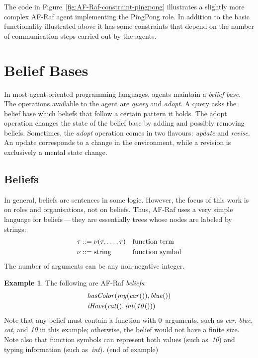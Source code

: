 \documentclass[a4paper,12pt,oneside,fleqn]{book} %
\theoremstyle{plain}
\theoremstyle{definition}
\newtheorem{example}{Example}
\theoremstyle{remark}
\newcommand{\eox}[1]{\hskip5mm\null\nobreak\hfill#1}
\newcommand{\eoe}{\eox{(end of example)}}
\newcommand{\rg}[1]{\marginpar{\tiny\raggedright\textcolor{blue}{\bf rg:} #1}}
\begin{document}
\rg{It's ${\it value}:{\it type}$, not ${\it type}:{\it value}$.}

The code in Figure~\ref{fig:AF-Raf-constraint-pingpong} illustrates a
slightly more complex AF-Raf agent implementing the PingPong role. In
addition to the basic functionality illustrated above it has some
constraints that depend on the number of communication steps carried out by
the agents.


\section{Belief Bases} %

In most agent-oriented programming languages, agents maintain a
\emph{belief base}.  The operations available to the agent are
\textit{query} and \textit{adopt}.  A query asks the belief base which
beliefs that follow a certain pattern it holds.  The adopt operation
changes the state of the belief base by adding and possibly removing
beliefs.  Sometimes, the {\it adopt\/} operation comes in two flavours:
{\it update\/} and {\it revise}.  An update corresponds to a change in the
environment, while a revision is exclusively a mental state change.

\subsection{Beliefs}

In general, beliefs are sentences in some logic.  However, the focus of
this work is on roles and organisations, not on beliefs.  Thus, AF-Raf uses
a very simple language for beliefs\,---\,they are essentially trees whose
nodes are labeled by strings: \begin{align} \tau &::= \nu(\tau,\ldots,\tau)
&& \text{function term} \\ \nu  &::= {\rm string} &&\text{function symbol}
\end{align} The number of arguments can be any non-negative integer.

\begin{example} The following are AF-Raf \emph{beliefs}: \begin{align}
&{\it hasColor}({\it my}({\it car}()), {\it blue}()) \\ &{\it iHave}({\it
cat}(), {\it int}({\it 10}())) \end{align} Note that any belief must
contain a function with $0$~arguments, such as {\it car}, {\it blue}, {\it
cat}, and {\it 10\/} in this example; otherwise, the belief would not have
a finite size.  Note also that function symbols can represent both values
(such as~{\it 10\/}) and typing information (such as~{\it int\/}).  \eoe
\end{example}
\end{document}
